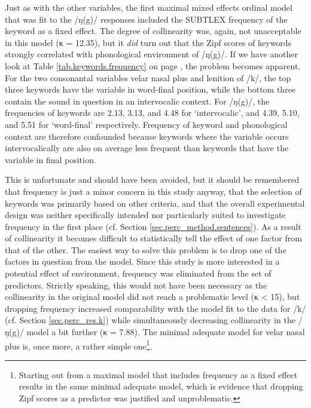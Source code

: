 Just as with the other variables, the first maximal mixed effects ordinal model that was fit to the /ŋ(g)/ responses included the SUBTLEX frequency of the keyword as a fixed effect.
The degree of collinearity was, again, not unacceptable in this model (κ = 12.35), but it \emph{did} turn out that the Zipf scores of keywords strongly correlated with phonological environment of /ŋ(g)/.
If we have another look at Table \ref{tab.keywords.frequency} on page \pageref{tab.keywords.frequency}, the problem becomes apparent.
For the two consonantal variables velar nasal plus and lenition of /k/, the top three keywords have the variable in word-final position, while the bottom three contain the sound in question in an intervocalic context.
For /ŋ(g)/, the frequencies of keywords are 2.13, 3.13, and 4.48 for `intervocalic', and 4.39, 5.10, and 5.51 for `word-final' respectively.
Frequency of keyword and phonological context are therefore confounded because keywords where the variable occurs intervocalically are also on average less frequent than keywords that have the variable in final position.

This is unfortunate and should have been avoided, but it should be remembered that frequency is just a minor concern in this study anyway, that the selection of keywords was primarily based on other criteria, and that the overall experimental design was neither specifically intended nor particularly suited to investigate frequency in the first place (cf. Section \ref{sec.perc_method.sentences}).
As a result of collinearity it becomes difficult to statistically tell the effect of one factor from that of the other.
The easiest way to solve this problem is to drop one of the factors in question from the model.
Since this study is more interested in a potential effect of environment, frequency was eliminated from the set of predictors.
Strictly speaking, this would not have been necessary as the collinearity in the original model did not reach a problematic level (κ < 15), but dropping frequency increased comparability with the model fit to the data for /k/ (cf. Section \ref{sec.perc_res.k}) while simultaneously decreasing collinearity in the /ŋ(g)/ model a bit further (κ = 7.88).
The minimal adequate model for velar nasal plus is, once more, a rather simple one\footnote{Starting out from a maximal model that includes frequency as a fixed effect results in the same minimal adequate model, which is evidence that dropping Zipf scores as a predictor was justified and unproblematic.}.

